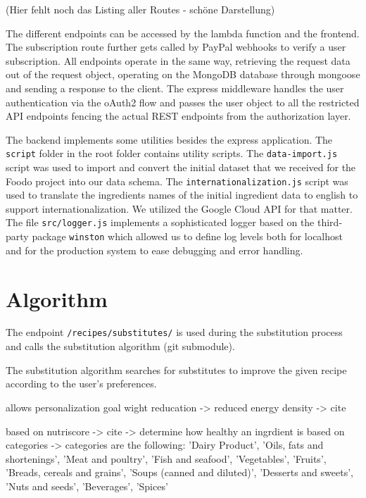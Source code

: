 (Hier fehlt noch das Listing aller Routes - schöne Darstellung)

The different endpoints can be accessed by the lambda function and the frontend. The subscription route further gets called by PayPal webhooks to verify a user subscription. All endpoints operate in the same way, retrieving the request data out of the request object, operating on the MongoDB database through mongoose and sending a response to the client. The express middleware handles the user authentication via the oAuth2 flow and passes the user object to all the restricted API endpoints fencing the actual REST endpoints from the authorization layer. 


The backend implements some utilities besides the express application. The \texttt{script} folder in the root folder contains utility scripts. The \texttt{data-import.js} script was used to import and convert the initial dataset that we received for the Foodo project into our data schema. The \texttt{internationalization.js} script was used to translate the ingredients names of the initial ingredient data to english to support internationalization. We utilized the Google Cloud API for that matter. The file \texttt{src/logger.js} implements a sophisticated logger based on the third-party package \texttt{winston} which allowed us to define log levels both for localhost and for the production system to ease debugging and error handling. 

\section{Algorithm}
The endpoint \texttt{/recipes/substitutes/} is used during the substitution process and calls the substitution algorithm (git submodule).

The substitution algorithm searches for substitutes to improve the given recipe according to the user's preferences. 

allows personalization 
goal wight reducation -> reduced energy density -> cite

based on nutriscore -> cite -> determine how healthy an ingrdient is
based on categories ->             categories are the following: 'Dairy Product',  'Oils, fats and shortenings', 'Meat and poultry',    'Fish and seafood', 'Vegetables', 'Fruits', 'Breads, cereals and grains', 'Soups (canned and diluted)', 'Desserts and sweets', 'Nuts and seeds', 'Beverages', 'Spices'


